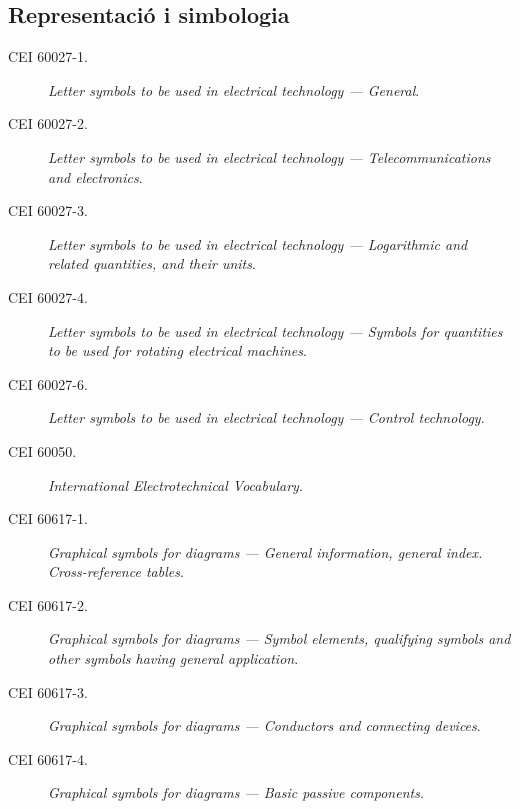 \subsection*{Representació i simbologia}
\begin{description}
    \item [\hspace{5mm}CEI 60027-1.] \textit{Letter symbols to be used in electrical technology --- General}.
    \item [\hspace{5mm}CEI 60027-2.] \textit{Letter symbols to be used in electrical technology --- Telecommunications and electronics}.
    \item [\hspace{5mm}CEI 60027-3.] \textit{Letter symbols to be used in electrical technology --- Logarithmic and related quantities, and their units}.
    \item [\hspace{5mm}CEI 60027-4.] \textit{Letter symbols to be used in electrical technology --- Symbols for quantities to be used for rotating electrical machines}.
    \item [\hspace{5mm}CEI 60027-6.] \textit{Letter symbols to be used in electrical technology --- Control technology}.
    \item [\hspace{5mm}CEI 60050.] \textit{International Electrotechnical Vocabulary}. 
    \item [\hspace{5mm}CEI 60617-1.] \textit{Graphical symbols for diagrams --- General information, general index. Cross-reference tables}.
    \item [\hspace{5mm}CEI 60617-2.] \textit{Graphical symbols for diagrams --- Symbol elements, qualifying symbols and other symbols having general application}.
    \item [\hspace{5mm}CEI 60617-3.] \textit{Graphical symbols for diagrams --- Conductors and connecting devices}.
    \item [\hspace{5mm}CEI 60617-4.] \textit{Graphical symbols for diagrams --- Basic passive components}.

\end{description}
